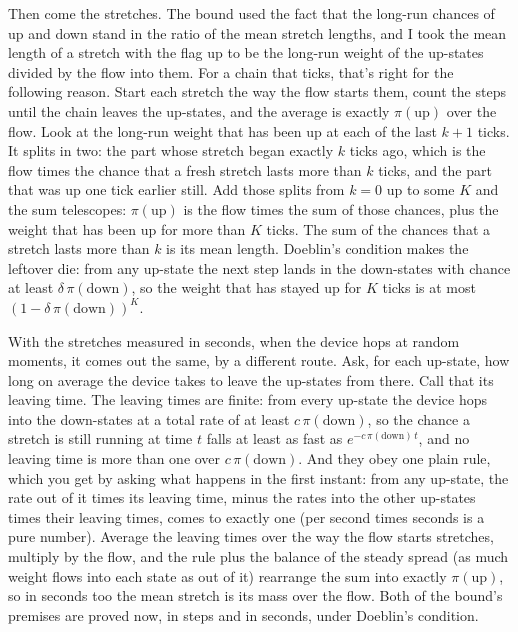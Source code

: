 \documentclass[11pt,twoside]{article}
\theoremstyle{thielethm}
\theoremstyle{thieledef}
\theoremstyle{thieledef}
\theoremstyle{thieledef}
\theoremstyle{thielethm}
\theoremstyle{thieleobs}
\theoremstyle{thielethm}
\begin{document}
Then come the stretches. The bound used the fact that the long-run chances of up and down stand in the
ratio of the mean stretch lengths, and I took the mean length of a stretch with the flag up to be
the long-run weight of the up-states divided by the flow into them. For a chain that ticks, that's right for the following reason. Start each stretch the way the flow starts them, count the steps until the chain
leaves the up-states, and the average is exactly $\pi(\mathrm{up})$ over the flow. Look at the
long-run weight that has been up at each of the last $k + 1$ ticks. It splits in two: the part
whose stretch began exactly $k$ ticks ago, which is the flow times the chance that a fresh stretch
lasts more than $k$ ticks, and the part that was up one tick earlier still. Add those splits from
$k = 0$ up to some $K$ and the sum telescopes: $\pi(\mathrm{up})$ is the flow times the sum of
those chances, plus the weight that has been up for more than $K$ ticks. The sum of the chances
that a stretch lasts more than $k$ is its mean length. Doeblin's condition makes the leftover die:
from any up-state the next step lands in the down-states with chance at least
$\delta\,\pi(\mathrm{down})$, so the weight that has stayed up for $K$ ticks is at most
$(1-\delta\,\pi(\mathrm{down}))^K$.

With the stretches measured in seconds, when the device hops at random moments, it comes out the
same, by a different route. Ask, for each up-state, how long on average the device takes to
leave the up-states from there. Call that its leaving time. The leaving times are finite: from
every up-state the device hops into the down-states at a total rate of at least
$c\,\pi(\mathrm{down})$, so the chance a stretch is still running at time $t$ falls at least as
fast as $e^{-c\,\pi(\mathrm{down})\,t}$, and no leaving time is more than one over
$c\,\pi(\mathrm{down})$. And they obey one plain rule, which you get by asking what happens in the
first instant: from any up-state, the rate out of it times its leaving time, minus the rates into
the other up-states times their leaving times, comes to exactly one (per second times seconds is a
pure number). Average the leaving times over the way the flow starts stretches, multiply by the
flow, and the rule plus the balance of the steady spread (as much weight flows into each state as
out of it) rearrange the sum into exactly $\pi(\mathrm{up})$, so in seconds too the mean stretch is its mass over the flow. Both of
the bound's premises are proved now, in steps and in seconds, under Doeblin's condition.
\end{document}
